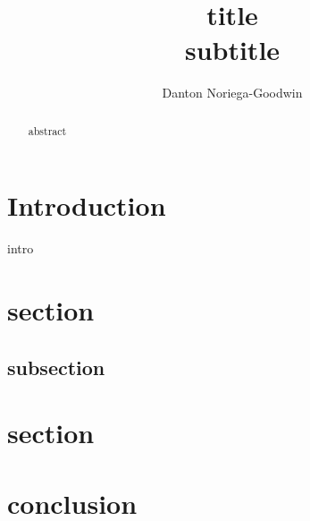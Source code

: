 \documentclass[12pt,letterpaper]{article}
\begin{document}
\title{\textbf{title}\\{\small \textbf{subtitle}}}
\author{Danton Noriega-Goodwin}
\date{}
\maketitle
\begin{abstract}
abstract
\end{abstract}


\section*{Introduction}
intro \citep{aguiar_consumption_2005}
\section{section}

\subsection{subsection}


\section{section}

\section{conclusion}
         



\end{document}
